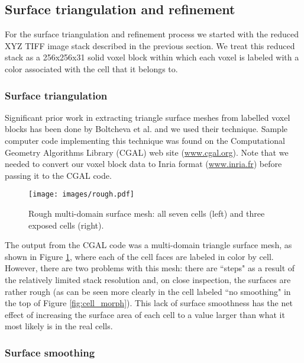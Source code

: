 \documentclass[a4paper,10pt]{article}
\begin{document}
\subsection{Surface triangulation and refinement}

For the surface triangulation and refinement process we started with the reduced XYZ TIFF image stack described in the previous section. We treat this reduced stack as a 256x256x31 solid voxel block within which each voxel is labeled with a color associated with the cell that it belongs to. 

\subsubsection{Surface triangulation}

Significant prior work in extracting triangle surface meshes from labelled voxel blocks has been done by Boltcheva et al.\cite{boltcheva:inria-00420228} and we used their technique. Sample computer code implementing this technique was found on the Computational Geometry Algorithms Library (CGAL) web site (\url{www.cgal.org}). Note that we needed to convert our voxel block data to Inria format (\url{www.inria.fr}) before passing it to the CGAL code.

\begin{figure}[H]
\begin{center}
\texttt{[image: images/rough.pdf]}
\end{center}
\caption{Rough multi-domain surface mesh: all seven cells (left) and three exposed cells (right).}
\label{fig:rough}
\end{figure}

The output from the CGAL code was a multi-domain triangle surface mesh, as shown in Figure \ref{fig:rough}, where each of the cell faces are labeled in color by cell. However, there are two problems with this mesh: there are ``steps" as a result of the relatively limited stack resolution and, on close inspection, the surfaces are rather rough (as can be seen more clearly in the cell labeled ``no smoothing" in the top of Figure \ref{fig:cell_morph}). This lack of surface smoothness has the net effect of increasing the surface area of each cell to a value larger than what it most likely is in the real cells.\\

\subsubsection{Surface smoothing}
\end{document}
